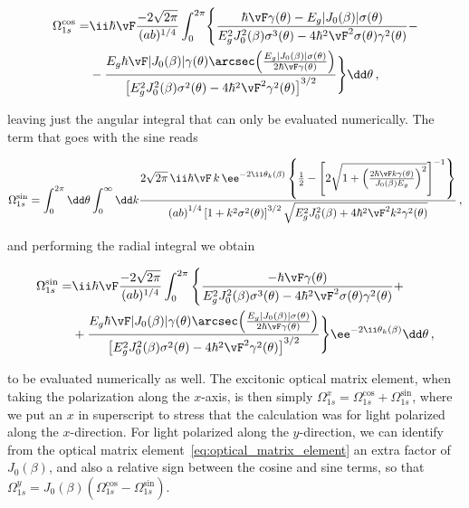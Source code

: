 \begin{equation}
    \begin{aligned}
        \Omega^{\cos}_{1s} =& \ii \hbar \vF\frac{-2\sqrt{2\pi}}{(a b)^{1/4}}\int_{0}^{2\pi} \Biggl\{ \frac{\hbar \vF \gamma(\theta)-E_{g}|J_{0}(\beta)|\sigma(\theta)}{E_{g}^{2}J_{0}^{2}(\beta)\sigma^{3}(\theta) - 4\hbar^{2}\vF^{2}\sigma(\theta)\gamma^{2}(\theta)} -\\
        & - \frac{E_{g}\hbar \vF|J_{0}(\beta)|\gamma(\theta) \arcsec \! \left(\frac{E_{g}|J_{0}(\beta)|\sigma(\theta)}{2\hbar \vF\gamma(\theta)}\right)}{\left[E_{g}^{2}J_{0}^{2}(\beta)\sigma^{2}(\theta)-4\hbar^{2}\vF^{2}\gamma^{2}(\theta)\right]^{3/2}} \Biggl\} \dd\theta \,,
    \end{aligned}
\end{equation}


\noindent leaving just the angular integral that can only be evaluated numerically.
The term that goes with the sine reads

\begin{equation}
    \Omega^{\sin}_{1s} = \int_{0}^{2\pi} \dd\theta \int_{0}^{\infty} \dd k \frac{ 2\sqrt{2\pi}\, \ii \hbar \vF\, k\, \ee^{-2\ii\theta_{k}(\beta)} \left\{\frac{1}{2} - \left[2 \sqrt{1+\left(\frac{2\hbar \vF k \gamma(\theta)}{J_{0}(\beta)E_{g}}\right)^{2}}\right]^{-1}\right\}}{\left(a b\right)^{1/4} \left[1+k^{2}\sigma^{2}(\theta)\right]^{3/2} \sqrt{E_{g}^{2}J_{0}^{2}(\beta)+4\hbar^{2}\vF^{2}k^{2}\gamma^{2}(\theta)}}\,,
\end{equation}

\noindent and performing the radial integral we obtain

\begin{equation}
    \begin{aligned}
        \Omega^{\sin}_{1s} =& \ii \hbar \vF \frac{-2\sqrt{2\pi}}{(a b )^{1/4}}\int_{0}^{2\pi}\Bigg\{\frac{-\hbar \vF\gamma(\theta)}{E_{g}^{2}J_{0}^{2}(\beta)\sigma^{3}(\theta)-4\hbar^{2}\vF^{2}\sigma(\theta)\gamma^{2}(\theta)} + \\
        &+\frac{E_{g}\hbar \vF|J_{0}(\beta)|\gamma(\theta)\arcsec\!\left(\frac{E_{g}|J_{0}(\beta)|\sigma(\theta)}{2\hbar \vF\gamma(\theta)}\right)}{\left[E_{g}^{2}J_{0}^{2}(\beta)\sigma^{2}(\theta)-4\hbar^{2}\vF^{2}\gamma^{2}(\theta)\right]^{3/2}}\Bigg\}\ee^{-2\ii\theta_{k}(\beta)} \dd\theta \,,
    \end{aligned}
\end{equation}


\noindent to be evaluated numerically as well.
The excitonic optical matrix element, when taking the polarization along the $x$-axis, is then simply $\Omega^x_{1s} = \Omega^{\cos}_{1s} + \Omega^{\sin}_{1s}$, where we put an $x$ in superscript to stress that the calculation was for light polarized along the $x$-direction.
For light polarized along the $y$-direction, we can identify from the optical matrix element~\eqref{eq:optical_matrix_element} an extra factor of $J_0(\beta)$, and also a relative sign between the cosine and sine terms, so that $\Omega^y_{1s} = J_0(\beta) (\Omega^{\cos}_{1s} - \Omega^{\sin}_{1s})$.

